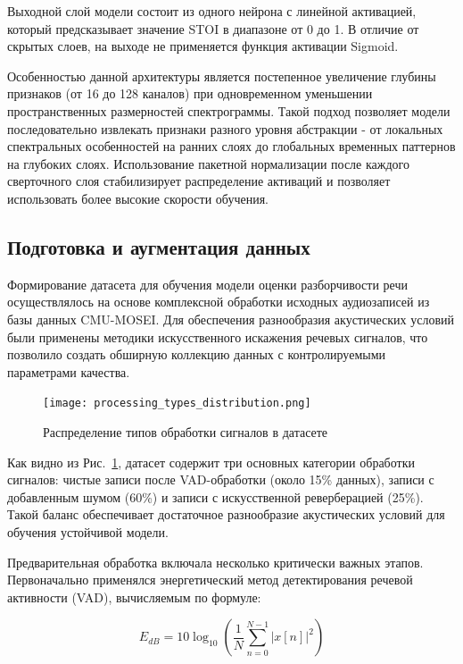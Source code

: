 \documentclass[oneside, final, 14pt]{extarticle}
\begin{document}
Выходной слой модели состоит из одного нейрона с линейной активацией, который предсказывает значение STOI в диапазоне от 0 до 1. В отличие от скрытых слоев, на выходе не применяется функция активации Sigmoid.

Особенностью данной архитектуры является постепенное увеличение глубины признаков (от 16 до 128 каналов) при одновременном уменьшении пространственных размерностей спектрограммы. Такой подход позволяет модели последовательно извлекать признаки разного уровня абстракции - от локальных спектральных особенностей на ранних слоях до глобальных временных паттернов на глубоких слоях. Использование пакетной нормализации после каждого сверточного слоя стабилизирует распределение активаций и позволяет использовать более высокие скорости обучения.

\subsection{Подготовка и аугментация данных}

Формирование датасета для обучения модели оценки разборчивости речи осуществлялось на основе комплексной обработки исходных аудиозаписей из базы данных CMU-MOSEI. Для обеспечения разнообразия акустических условий были применены методики искусственного искажения речевых сигналов, что позволило создать обширную коллекцию данных с контролируемыми параметрами качества.

\begin{figure}[]
	\centering
	\texttt{[image: processing\_types\_distribution.png]}
	\caption{Распределение типов обработки сигналов в датасете}
	\label{fig:processing_types}
\end{figure}

Как видно из Рис.~\ref{fig:processing_types}, датасет содержит три основных категории обработки сигналов: чистые записи после VAD-обработки (около 15\% данных), записи с добавленным шумом (60\%) и записи с искусственной реверберацией (25\%). Такой баланс обеспечивает достаточное разнообразие акустических условий для обучения устойчивой модели.

Предварительная обработка включала несколько критически важных этапов. Первоначально применялся энергетический метод детектирования речевой активности (VAD), вычисляемым по формуле:

\begin{equation}
	E_{dB} = 10\log_{10}\left(\frac{1}{N}\sum_{n=0}^{N-1}|x[n]|^2\right)
\end{equation}
\end{document}
